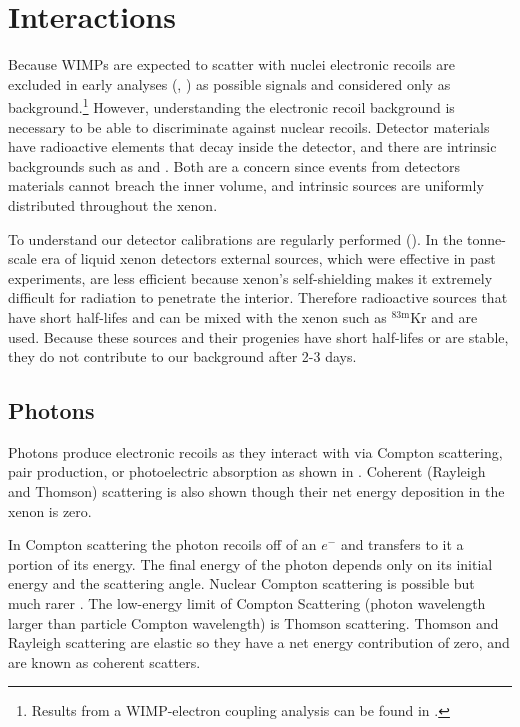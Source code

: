 \section{Interactions}
\label{sec:interactions}
Because WIMPs are expected to scatter with nuclei electronic recoils are excluded in early analyses (,
) as possible signals and considered only as background.\footnote{Results from a WIMP-electron coupling analysis can
be found in .}  However, understanding the electronic recoil background is necessary to be able to discriminate
against nuclear recoils.  Detector materials have radioactive elements that decay inside the detector, and there are intrinsic
backgrounds such as \krypton and \radon.  Both are a concern since events from
detectors materials cannot breach the inner volume, and intrinsic sources are uniformly distributed throughout the xenon.

To understand our detector calibrations are regularly performed ().  In the tonne-scale era of liquid xenon
detectors external sources, which were effective in past experiments, are less efficient because xenon's self-shielding makes it extremely
difficult for radiation to penetrate the interior.  Therefore radioactive
sources that have short half-lifes and can be mixed with the xenon such as $\mathrm{^{83m}Kr}$ and \radoncal are used.  Because these
sources and their progenies have short half-lifes or are stable, they do not contribute to our background after 2-3 days.

\subsection{Photons}
\label{subsec:photons}
Photons produce electronic recoils as they interact with \electron via Compton scattering, pair production, or photoelectric absorption
as shown in .  Coherent (Rayleigh and Thomson) scattering is also shown though their net energy deposition in the
xenon is zero.

In Compton scattering the photon recoils off of an $e^{-}$ and transfers to it a portion of its energy.  The final energy of the photon
depends only on its initial energy and the scattering angle.  Nuclear Compton scattering is possible but much rarer
.  The low-energy limit of Compton Scattering (photon wavelength larger than particle Compton wavelength) is
Thomson scattering.  Thomson and Rayleigh scattering are elastic so they have a net energy contribution of zero, and are known as coherent
scatters.

